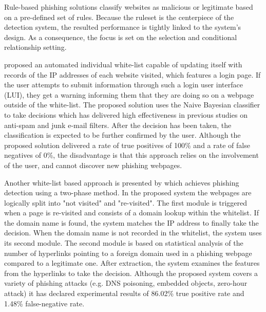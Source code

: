 
Rule-based phishing solutions classify websites as malicious or legitimate based
on a pre-defined set of rules. Because the ruleset is the centerpiece of the
detection system, the resulted performance is tightly linked to the system's
design. As a consequence, the focus is set on the selection and conditional
relationship setting.

\cite{ANTIPHISHING_AUTOMATED_WHITELIST} proposed an automated individual
white-list capable of updating itself with records of the IP addresses of each
website visited, which features a login page. If the user attempts to submit
information through such a login user interface (LUI), they get a warning
informing them that they are doing so on a webpage outside of the white-list.
The proposed solution uses the Naive Bayesian classifier to take decisions which
has delivered high effectiveness in previous studies on anti-spam
\citep{BAESYAN_KEYWORD_COMPARISON} and junk e-mail
\citep{BAESYAN_JUNK_FILTERING} filters. After the decision has been taken, the
classification is expected to be further confirmed by the user. Although the
proposed solution delivered a rate of true positives of 100\% and a rate of
false negatives of 0\%, the disadvantage is that this approach relies on the
involvement of the user, and cannot discover new phishing webpages.

Another white-list based approach is presented by
\cite{ANTIPHISHING_AUTOUPDATED_WHITELIST} which achieves phishing detection
using a two-phase method. In the proposed system the webpages are logically
split into "not visited" and "re-visited". The first module is triggered when a
page is re-visited and consists of a domain lookup within the whitelist. If the
domain name is found, the system matches the IP address to finally take the
decision. When the domain name is not recorded in the whitelist, the system uses
its second module. The second module is based on statistical analysis of the
number of hyperlinks pointing to a foreign domain used in a phishing webpage
compared to a legitimate one. After extraction, the system examines the features
from the hyperlinks to take the decision. Although the proposed system covers a
variety of phishing attacks (e.g. DNS poisoning, embedded objects, zero-hour
attack) it has declared experimental results of 86.02\% true positive rate and
1.48\% false-negative rate.

